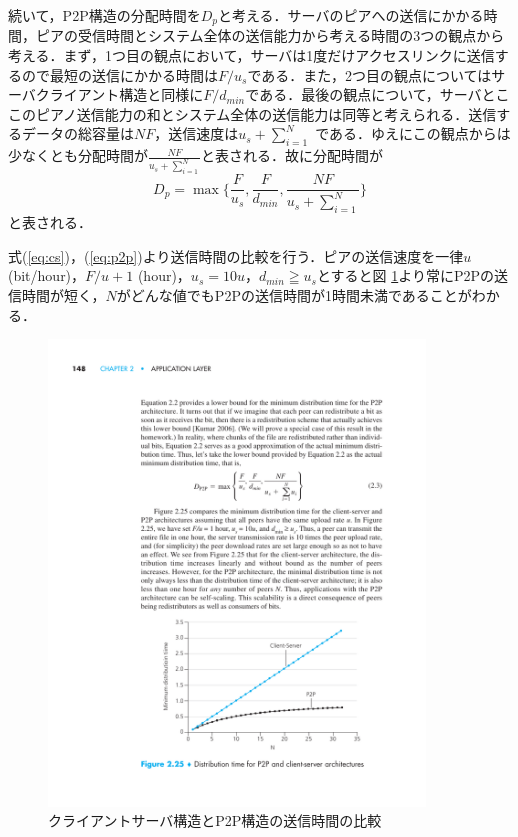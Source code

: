 \documentclass[9pt,a4j,twocolumn]{jsarticle}
\begin{document}
続いて，P2P構造の分配時間を$D_p$と考える．サーバのピアへの送信にかかる時間，ピアの受信時間とシステム全体の送信能力から考える時間の3つの観点から考える．まず，1つ目の観点において，サーバは1度だけアクセスリンクに送信するので最短の送信にかかる時間は$F/u_s$である．また，2つ目の観点についてはサーバクライアント構造と同様に$F/{d}_{min}$である．最後の観点について，サーバとここのピアノ送信能力の和とシステム全体の送信能力は同等と考えられる．送信するデータの総容量は$NF$，送信速度は$u_s + \sum^{N}_{i=1}$ である．ゆえにこの観点からは少なくとも分配時間が$\frac{NF}{u_s + \sum^{N}_{i=1}}$と表される．故に分配時間が
\begin{equation}
D_p = \max \{ \frac{F}{u_s}, \frac{F}{{d}_{min}}, \frac{NF}{u_s + \sum^{N}_{i=1}} \}
\label{eq:p2p}
\end{equation}
と表される．

式(\ref{eq:cs})，(\ref{eq:p2p})より送信時間の比較を行う．ピアの送信速度を一律$u$ (bit/hour)，$F/u + 1$ (hour)，$u_s = 10u$，${d}_{min} \geqq u_s$とすると図
\ref{fig:graph}より常にP2Pの送信時間が短く，$N$がどんな値でもP2Pの送信時間が1時間未満であることがわかる．
\begin{figure}[tb]
\includegraphics[width=10cm,pagebox=cropbox,clip]{graph.pdf}
 \caption{クライアントサーバ構造とP2P構造の送信時間の比較}
 \label{fig:graph}
\end{figure}
\\
\end{document}
